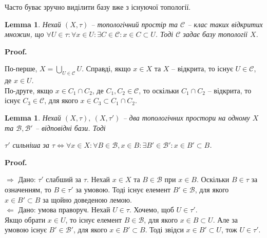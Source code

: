 \documentclass[a4paper, 10pt]{article}
\makeatletter
\def\rightproof{$\boxed{\Rightarrow}$ }
\def\leftproof{$\boxed{\Leftarrow}$ }
\theoremstyle{theoremdd}
\newtheorem{lemma}[theorem]{Lemma}
\renewenvironment{proof}[1][Proof.\\]{\par
\pushQED{\hfill \qed}%
\normalfont \topsep6\p@\@plus6\p@\relax
\trivlist
\item\relax
{\bfseries
#1\@addpunct{.}}\hspace\labelsep\ignorespaces
}{%
\popQED\endtrivlist\@endpefalse
}
\makeatother
\begin{document}
\noindent
Часто буває зручно виділити базу вже з існуючої топології.

\begin{lemma}
Нехай $(X,\tau)$ -- топологічний простір та $\mathcal{C}$ -- клас таких  відкритих множин, що $\forall U \in \tau: \forall x \in U: \exists C \in \mathcal{C}: x \in C \subset U$. Тоді $\mathcal{C}$ задає базу топології $X$.
\end{lemma}

\begin{proof}
По-перше, $X = \displaystyle\bigcup_{U \in \mathcal{C}} U$. Справді, якщо $x \in X$ та $X$ -- відкрита, то існує $U \in \mathcal{C}$, де $x \in U$.\\
По-друге, якщо $x \in C_1 \cap C_2$, де $C_1,C_2 \in \mathcal{C}$, то оскільки $C_1 \cap C_2$ -- відкрита, то існує $C_3 \in \mathcal{C}$, для якого $x \in C_3 \subset C_1 \cap C_2$. 
\end{proof}

\begin{lemma}
Нехай $(X,\tau),\ (X,\tau')$ -- два топологічних простори на одному $X$ та $\mathcal{B},\mathcal{B}'$ -- відповідні бази. Тоді
\begin{center}
$\tau'$ сильніша за $\tau \iff \forall x \in X: \forall B \in \mathcal{B}, x \in B: \exists B' \in \mathcal{B}': x \in B' \subset B$.
\end{center}
\end{lemma}

\begin{proof}
\rightproof Дано: $\tau'$ слабший за $\tau$. Нехай $x \in X$ та $B \in \mathcal{B}$ при $x \in B$. Оскільки $B \in \tau$ за означенням, то $B \in \tau'$ за умовою. Тоді існує елемент $B' \in \mathcal{B}$, для якого $x \in B' \subset B$ за щойно доведеною лемою.
\bigskip \\
\leftproof Дано: умова праворуч. Нехай $U \in \tau$. Хочемо, щоб $U \in \tau'$.\\
Якщо обрати $x \in U$, то існує елемент $B \in \mathcal{B}$, для якого $x \in B \subset U$. Але за умовою існує $B' \in \mathcal{B}'$, для якого $x \in B' \subset B$. Тоді звідси $x \in B' \subset U$, тож $U \in \tau'$.
\end{proof}
\end{document}
